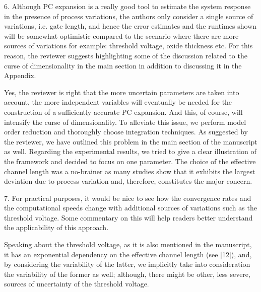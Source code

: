 \begin{reviewer}
6. Although PC expansion is a really good tool to estimate the system response in the presence of process variations, the authors only consider a single source of variations, i.e. gate length, and hence the error estimates and the runtimes shown will be somewhat optimistic compared to the scenario where there are more sources of variations for example: threshold voltage, oxide thickness etc. For this reason, the reviewer suggests highlighting some of the discussion related to the curse of dimensionality in the main section in addition to discussing it in the Appendix.
\end{reviewer}
\begin{authors}
Yes, the reviewer is right that the more uncertain parameters are taken into account, the more independent variables will eventually be needed for the construction of a sufficiently accurate PC expansion.
And this, of course, will intensify the curse of dimensionality.
To alleviate this issue, we perform model order reduction and thoroughly choose integration techniques.
As suggested by the reviewer, we have outlined this problem in the main section of the manuscript as well.
Regarding the experimental results, we tried to give a clear illustration of the framework and decided to focus on one parameter.
The choice of the effective channel length was a no-brainer as many studies show that it exhibits the largest deviation due to process variation and, therefore, constitutes the major concern.
\end{authors}

\begin{reviewer}
7. For practical purposes, it would be nice to see how the convergence rates and the computational speeds change with additional sources of variations such as the threshold voltage. Some commentary on this will help readers better understand the applicability of this approach.
\end{reviewer}
\begin{authors}
Speaking about the threshold voltage, as it is also mentioned in the manuscript, it has an exponential dependency on the effective channel length (see [12]), and, by considering the variability of the latter, we implicitly take into consideration the variability of the former as well; although, there might be other, less severe, sources of uncertainty of the threshold voltage.
\end{authors}
